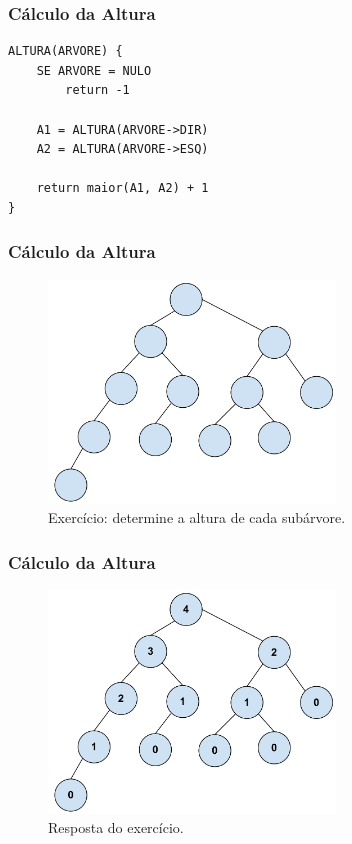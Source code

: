 \begin{frame}[fragile]
\frametitle{Cálculo da Altura}
\begin{verbatim}
ALTURA(ARVORE) {
    SE ARVORE = NULO
        return -1
        
    A1 = ALTURA(ARVORE->DIR)
    A2 = ALTURA(ARVORE->ESQ)
    
    return maior(A1, A2) + 1
}
\end{verbatim}

\end{frame}

\begin{frame}
\frametitle{Cálculo da Altura}

\begin{figure}[tbp]
\includegraphics[keepaspectratio=true,width=3in]{figs/fig_arvores/altura1}
\centering
\caption{Exercício: determine a altura de cada subárvore.}
\end{figure}

\end{frame}

\begin{frame}
\frametitle{Cálculo da Altura}

\begin{figure}[tbp]
\includegraphics[keepaspectratio=true,width=3in]{figs/fig_arvores/altura2}
\centering
\caption{Resposta do exercício.}
\end{figure}

\end{frame}

